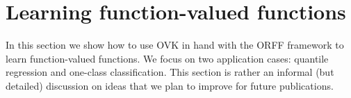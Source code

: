 


\section{Learning function-valued functions}
In this section we show how to use \acs{OVK} in hand with the \acs{ORFF}
framework to learn function-valued functions. We focus on two application
cases: quantile regression and one-class classification. This section is rather
an informal (but detailed) discussion on ideas that we plan to improve for
future publications.

